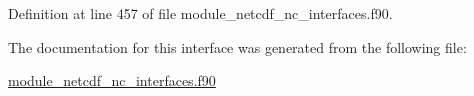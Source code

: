 Definition at line 457 of file module\+\_\+netcdf\+\_\+nc\+\_\+interfaces.\+f90.



The documentation for this interface was generated from the following file\+:\begin{DoxyCompactItemize}
\item 
\hyperlink{module__netcdf__nc__interfaces_8f90}{module\+\_\+netcdf\+\_\+nc\+\_\+interfaces.\+f90}\end{DoxyCompactItemize}
